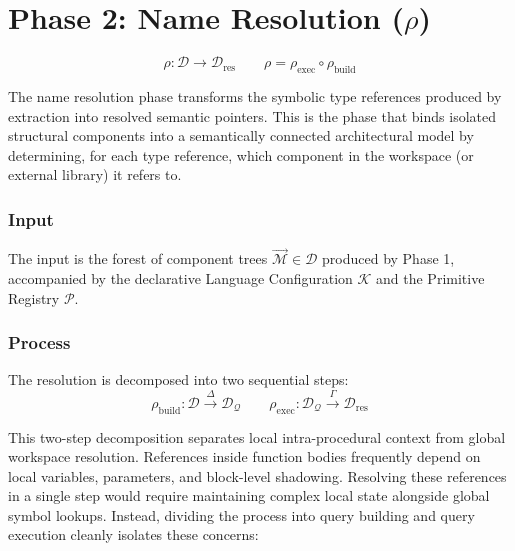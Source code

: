 \section{Phase 2: Name Resolution ($\rho$)}
\label{sec:phase2_overview}

$$\rho : \mathcal{D} \to \mathcal{D}_{\text{res}} \qquad \rho =
\rho_{\text{exec}} \circ \rho_{\text{build}}$$

The name resolution phase transforms the symbolic type references
produced by extraction into resolved semantic pointers. This is the
phase that binds isolated structural components into a semantically
connected architectural model by determining, for each type reference,
which component in the workspace (or external library) it refers to.

\subsubsection{Input}

The input is the forest of component trees $\vec{\mathcal{M}} \in \mathcal{D}$
produced by Phase 1, accompanied by the declarative Language Configuration
$\mathcal{K}$ and the Primitive Registry $\mathcal{P}$.

\subsubsection{Process}

The resolution is decomposed into two sequential steps:
$$\rho_{\text{build}} : \mathcal{D} \xrightarrow{\Delta}
\mathcal{D}_{\mathcal{Q}} \qquad \rho_{\text{exec}} :
\mathcal{D}_{\mathcal{Q}} \xrightarrow{\Gamma} \mathcal{D}_{\text{res}}$$

This two-step decomposition separates local intra-procedural context from
global workspace resolution. References inside function bodies frequently
depend on local variables, parameters, and block-level shadowing. Resolving
these references in a single step would require maintaining complex local state
alongside global symbol lookups. Instead, dividing the process into query
building and query execution cleanly isolates these concerns:

